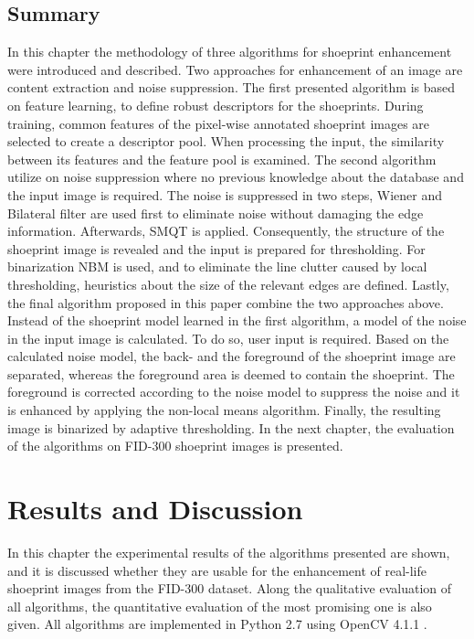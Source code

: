 \documentclass[draft,final]{vutinfth} %
\begin{document}
\section{Summary}
\par
In this chapter the methodology of three algorithms for shoeprint enhancement were introduced and described.
Two approaches for enhancement of an image are content extraction and noise suppression.
The first presented algorithm is based on feature learning, to define robust descriptors for the shoeprints.
During training, common features of the pixel-wise annotated shoeprint images are selected to create a descriptor pool.
When processing the input, the similarity between its features and the feature pool is examined.
The second algorithm utilize on noise suppression where no previous knowledge about the database and the input image is required.
The noise is suppressed in two steps, Wiener and Bilateral filter are used first to eliminate noise without damaging the edge information.
Afterwards, SMQT is applied.
Consequently, the structure of the shoeprint image is revealed and the input is prepared for thresholding.
For binarization NBM is used, and to eliminate the line clutter caused by local thresholding, heuristics about the size of the relevant edges are defined.
Lastly, the final algorithm proposed in this paper combine the two approaches above.
Instead of the shoeprint model learned in the first algorithm, a model of the noise in the input image is calculated.
To do so, user input is required.
Based on the calculated noise model, the back- and the foreground of the shoeprint image are separated, whereas the foreground area is deemed to contain the shoeprint.
The foreground is corrected according to the noise model to suppress the noise and it is enhanced by applying the non-local means algorithm.
Finally, the resulting image is binarized by adaptive thresholding.
In the next chapter, the evaluation of the algorithms on FID-300 shoeprint images is presented. 
\chapter{Results and Discussion}
\label{results}
\par
In this chapter the experimental results of the algorithms presented are shown, and it is discussed whether they are usable for the enhancement of real-life shoeprint images from the FID-300 dataset.
Along the qualitative evaluation of all algorithms, the quantitative evaluation of the most promising one is also given.
All algorithms are implemented in Python 2.7 \cite{van1995python} using OpenCV 4.1.1 \cite{opencv_library}.
\end{document}

